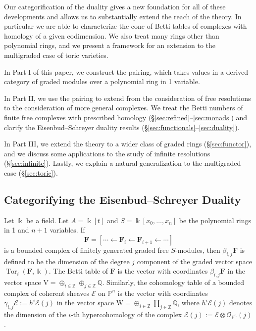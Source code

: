 \documentclass[12pt]{amsart}
\theoremstyle{definition}
\theoremstyle{remark}
\newcommand{\Tor}{\operatorname{Tor}}
\newcommand{\kk}{\Bbbk}
\newcommand{\PP}{\mathbb{P}}
\newcommand{\ZZ}{\mathbb{Z}}
\newcommand{\QQ}{\mathbb{Q}}
\newcommand{\VV}{\mathrm{V}}
\newcommand{\WW}{\mathrm{W}}
\newcommand{\cO}{\mathcal{O}}
\newcommand{\cE}{\mathcal{E}}
\newcommand{\FF}{\mathbf{F}}
\newcommand{\defi}[1]{\textsf{#1}} %
\begin{document}
Our categorification of the duality gives a new foundation for all of these developments and allows us to substantially extend the reach of the theory.  In particular we are able to characterize the cone of Betti tables of complexes with homology of a given codimension.
We also treat many rings other than polynomial rings, and we present a framework for an extension to the multigraded case of toric varieties.

In Part I of this paper, 
we construct the pairing, which takes values in a derived category of graded modules over a polynomial ring in 1 variable.

In Part II, we use the pairing to extend from the consideration of free resolutions to the consideration of more general complexes.
We treat the Betti numbers of finite free complexes with prescribed homology  (\S\ref{sec:refined}--\ref{sec:monads}) and clarify the Eisenbud--Schreyer duality results (\S\ref{sec:functionals}--\ref{sec:duality}).  

In Part III, we extend the theory to a wider class of graded rings (\S\ref{sec:functor}), and we discuss some applications to the study of infinite resolutions (\S\ref{sec:infinite}).  Lastly, we explain a natural generalization to the multigraded case (\S\ref{sec:toric}).

\subsection*{Categorifying the Eisenbud--Schreyer Duality}
Let $\kk$ be a field. Let $A= \kk[t]$ and $S=\kk[x_0, \dots, x_n]$ be the polynomial rings in 1 and $n+1$ variables. If 
$$
\FF= [\cdots \gets \FF_i \gets \FF_{i+1}\gets \cdots ]
$$
is a bounded complex of finitely generated graded free $S$-modules, then $\beta_{i,j}\FF$ is defined to be the dimension of the degree $j$ component of the graded vector space $\Tor_i(\FF,\kk)$.  The \defi{Betti table} of $\FF$ is the vector with coordinates $\beta_{i,j}\FF$ in the vector space $\VV = \oplus_{i\in \ZZ} \oplus_{j\in \ZZ}\QQ$. Similarly, the \defi{cohomology table} of a bounded complex of coherent sheaves $\cE$ on $\PP^{n}$ is the vector with coordinates $\gamma_{i,j}\cE := h^{i}\cE(j)$ in the vector space $\WW = \oplus_{i\in \ZZ}\prod_{j\in \ZZ}\QQ$, where $h^{i}\cE(j)$ denotes the dimension of the $i$-th hypercohomology of the complex $\cE(j) := \cE \otimes \cO_{\PP^{n}}(j)$. 
\end{document}
